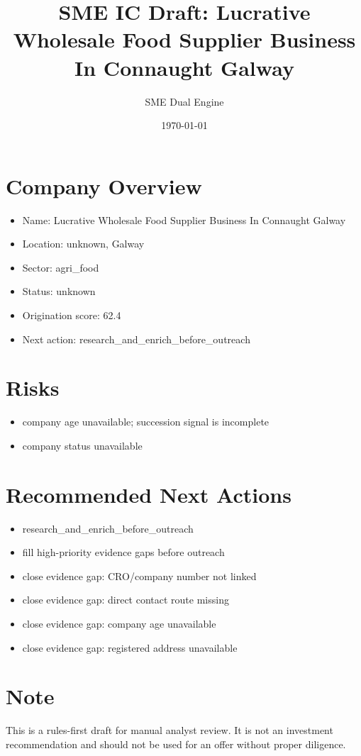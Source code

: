 \documentclass[11pt,a4paper]{article}
\title{SME IC Draft: Lucrative Wholesale Food Supplier Business In Connaught Galway}
\author{SME Dual Engine}
\date{\today}
\begin{document}
\maketitle
\section*{Company Overview}
\begin{itemize}[leftmargin=1.4em]
\item Name: Lucrative Wholesale Food Supplier Business In Connaught Galway
\item Location: unknown, Galway
\item Sector: agri\_food
\item Status: unknown
\item Origination score: 62.4
\item Next action: research\_and\_enrich\_before\_outreach
\end{itemize}
\section*{Risks}
\begin{itemize}[leftmargin=1.4em]
\item company age unavailable; succession signal is incomplete
\item company status unavailable
\end{itemize}
\section*{Recommended Next Actions}
\begin{itemize}[leftmargin=1.4em]
\item research\_and\_enrich\_before\_outreach
\item fill high-priority evidence gaps before outreach
\item close evidence gap: CRO/company number not linked
\item close evidence gap: direct contact route missing
\item close evidence gap: company age unavailable
\item close evidence gap: registered address unavailable
\end{itemize}
\section*{Note}
This is a rules-first draft for manual analyst review. It is not an investment
recommendation and should not be used for an offer without proper diligence.
\end{document}
